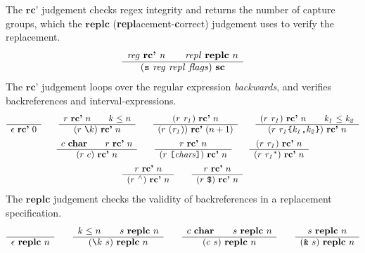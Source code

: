 \documentclass[11pt]{article}
\newcommand\RULE[3][]{\begin{array}{c} #2 \\ \hline #3 \end{array}}
\newcommand\J[1]{\ensuremath{\textbf{#1}}}
\newcommand\cmd[1]{\ensuremath{\text{\texttt{#1}}}}
\renewcommand\arg[1]{\ensuremath{\mathit{#1}}}
\newcommand\sanchor{\cmd{\ensuremath{{}^\land}}}
\newcommand\eanchor{\cmd{\$}}
\begin{document}
The \J{rc'} judgement checks regex integrity and returns the number of capture groups, which the \J{replc} (\textbf{repl}acement-\textbf{c}orrect) judgement uses to verify the replacement.
\begin{gather*}
	\RULE{\arg{reg}\ \J{rc'}\ \arg{n} \qquad \arg{repl}\ \J{replc}\ n}{(\cmd{s}\ \arg{reg}\ \arg{repl}\ \arg{flags})\ \J{sc}}
\end{gather*}
%
The \J{rc'} judgement loops over the regular expression \emph{backwards}, and verifies backreferences and interval-expressions.
\begin{gather*}
	\RULE{}{\epsilon\ \J{rc'}\ 0} \qquad
	\RULE{r\ \J{rc'}\ n \qquad k \leq n}{(r\ \cmd{\textbackslash} k)\ \J{rc'}\ n} \qquad
	\RULE{(r\ \arg{r_1})\ \J{rc'}\ n}{(r\ (\arg{r_1}))\ \J{rc'}\ (n + 1)} \qquad
	\RULE{(r\ \arg{r_1})\ \J{rc'}\ n \qquad \arg{k_1} \leq \arg{k_2}}{(r\ \arg{r_1}\cmd{\{}\arg{k_1}\cmd{,}\arg{k_2}\cmd{\}})\ \J{rc'}\ n} \\
	\RULE{c\ \J{char} \qquad r\ \J{rc'}\ n}{(r\ c)\ \J{rc'}\ n} \qquad
	\RULE{r\ \J{rc'}\ n}{(r\ \cmd{[} \arg{chars} \cmd{]})\ \J{rc'}\ n} \qquad
	\RULE{(r\ \arg{r_1})\ \J{rc'}\ n}{(r\ \arg{r_1}^*)\ \J{rc'}\ n} \\
	\RULE{r\ \J{rc'}\ n}{(r\ \sanchor)\ \J{rc'}\ n} \qquad
	\RULE{r\ \J{rc'}\ n}{(r\ \eanchor)\ \J{rc'}\ n}
\end{gather*}
%
The \J{replc} judgement checks the validity of backreferences in a replacement specification.
\begin{gather*}
	\RULE{}{\epsilon\ \J{replc}\ n} \qquad
	\RULE{k \leq n \qquad s\ \J{replc}\ n}{(\cmd{\textbackslash} k\ s)\ \J{replc}\ n} \qquad
	\RULE{c\ \J{char} \qquad s\ \J{replc}\ n}{(c\ s)\ \J{replc}\ n} \qquad
	\RULE{s\ \J{replc}\ n}{(\cmd{\&}\ s)\ \J{replc}\ n}
\end{gather*}
\end{document}
